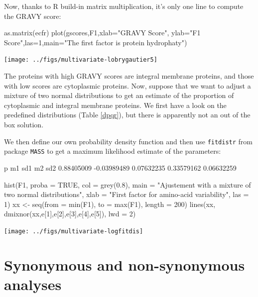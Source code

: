 \documentclass{article}
\begin{document}
Now, thanks to R build-in matrix multiplication, it's only one line to compute
the GRAVY score:

\begin{Schunk}
\begin{Sinput}
 as.matrix(ecfr) %
 plot(gscores,F1,xlab="GRAVY Score", ylab="F1 Score",las=1,main="The first factor is protein hydrophaty")
\end{Sinput}
\end{Schunk}
\texttt{[image: ../figs/multivariate-lobrygautier5]}

The proteins with high GRAVY scores are integral membrane proteins, and those
with low scores are cytoplasmic proteins. Now, suppose that we want to adjust
a mixture of two normal distributions to get an estimate of the proportion of
cytoplasmic and integral membrane proteins. We first have a look on the predefined
distributions (Table \ref{dpqr}), but there is apparently not an out of the box
solution.

We then define our own probability density function and then use \texttt{fitdistr} from package
\texttt{MASS} to get a maximum likelihood estimate of the parameters:

\begin{Schunk}
\begin{Soutput}
          p          m1         sd1          m2         sd2 
 0.88405009 -0.03989489  0.07632235  0.33579162  0.06632259 
\end{Soutput}
\begin{Sinput}
 hist(F1, proba = TRUE, col = grey(0.8), 
 main = "Ajustement with a mixture of two normal distributions",
 xlab = "First factor for amino-acid variability", las = 1)
 xx <- seq(from = min(F1), to = max(F1), length = 200)
 lines(xx, dmixnor(xx,e[1],e[2],e[3],e[4],e[5]), lwd = 2)
\end{Sinput}
\end{Schunk}
\texttt{[image: ../figs/multivariate-logfitdis]}

\section{Synonymous and non-synonymous analyses}
\end{document}

